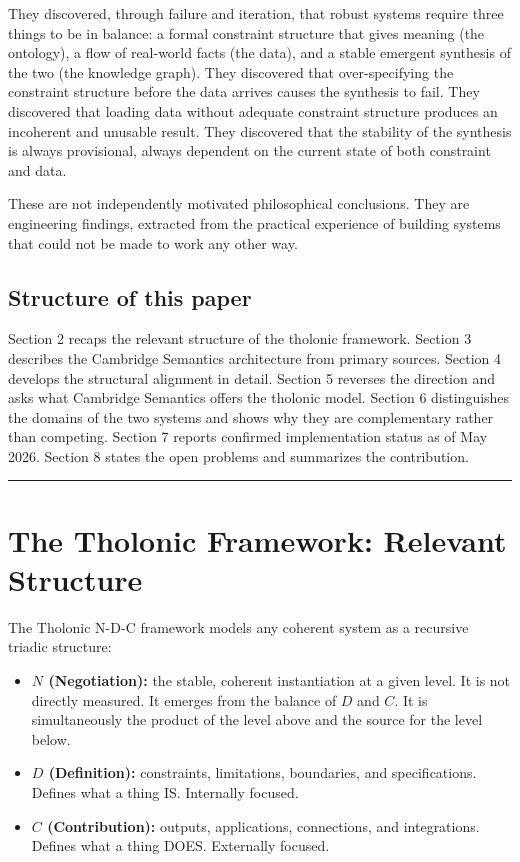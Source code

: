 \documentclass[12pt]{article}
\providecommand{\tightlist}{%
  \setlength{\itemsep}{0pt}\setlength{\parskip}{0pt}}
\begin{document}
They discovered, through failure and iteration, that robust systems
require three things to be in balance: a formal constraint structure
that gives meaning (the ontology), a flow of real-world facts (the
data), and a stable emergent synthesis of the two (the knowledge graph).
They discovered that over-specifying the constraint structure before the
data arrives causes the synthesis to fail. They discovered that loading
data without adequate constraint structure produces an incoherent and
unusable result. They discovered that the stability of the synthesis is
always provisional, always dependent on the current state of both
constraint and data.

These are not independently motivated philosophical conclusions. They
are engineering findings, extracted from the practical experience of
building systems that could not be made to work any other way.

\subsection{Structure of this paper}\label{structure-of-this-paper}

Section 2 recaps the relevant structure of the tholonic framework.
Section 3 describes the Cambridge Semantics architecture from primary
sources. Section 4 develops the structural alignment in detail. Section
5 reverses the direction and asks what Cambridge Semantics offers the
tholonic model. Section 6 distinguishes the domains of the two systems
and shows why they are complementary rather than competing. Section 7
reports confirmed implementation status as of May 2026. Section 8 states
the open problems and summarizes the contribution.

\begin{center}\rule{0.5\linewidth}{0.5pt}\end{center}

\section{The Tholonic Framework: Relevant Structure}\label{the-tholonic-framework-relevant-structure}

The Tholonic N-D-C framework models any coherent system as a recursive
triadic structure:

\begin{itemize}
\tightlist
\item
  \textbf{\(N\) (Negotiation):} the stable, coherent instantiation at a
  given level. It is not directly measured. It emerges from the balance
  of \(D\) and \(C\). It is simultaneously the product of the level
  above and the source for the level below.
\item
  \textbf{\(D\) (Definition):} constraints, limitations, boundaries, and
  specifications. Defines what a thing IS. Internally focused.
\item
  \textbf{\(C\) (Contribution):} outputs, applications, connections, and
  integrations. Defines what a thing DOES. Externally focused.
\end{itemize}
\end{document}
